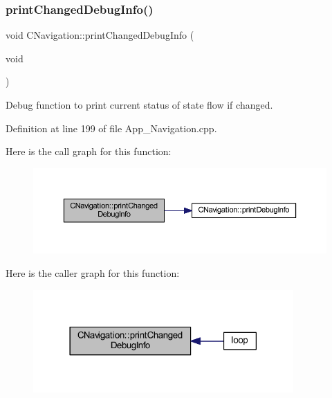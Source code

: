 \subsubsection{\texorpdfstring{print\+Changed\+Debug\+Info()}{printChangedDebugInfo()}}
{\footnotesize\ttfamily void C\+Navigation\+::print\+Changed\+Debug\+Info (\begin{DoxyParamCaption}\item[{void}]{ }\end{DoxyParamCaption})\hspace{0.3cm}{\ttfamily [virtual]}}



Debug function to print current status of state flow if changed. 



Definition at line 199 of file App\+\_\+\+Navigation.\+cpp.

Here is the call graph for this function\+:
\nopagebreak
\begin{figure}[H]
\begin{center}
\leavevmode
\includegraphics[width=350pt]{class_c_navigation_ac491c77788ba2e953a704b6ad622a665_cgraph}
\end{center}
\end{figure}
Here is the caller graph for this function\+:
\nopagebreak
\begin{figure}[H]
\begin{center}
\leavevmode
\includegraphics[width=282pt]{class_c_navigation_ac491c77788ba2e953a704b6ad622a665_icgraph}
\end{center}
\end{figure}
\mbox{\label{class_c_navigation_a84e320cd8975593ab6f966e8794b2886}} 
